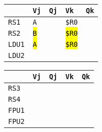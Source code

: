 \begin{enumerate}
    \begin{minipage}{0.45\textwidth}
        \centering
        \begin{tabular}{@{} l | l l l l @{}}
            \toprule
                & \texttt{Vj} & \texttt{Qj} & \texttt{Vk} & \texttt{Qk} \\
            \midrule
            \texttt{RS1} & \texttt{A} & & \texttt{\$R0} & \\ [.3em]
            \texttt{RS2} & \hl{\texttt{B}} & & \hl{\texttt{\$R0}} & \\
            \cmidrule{1-5}
            \texttt{LDU1} & \hl{\texttt{A}} & & \hl{\texttt{\$R0}} & \\ [.3em]
            \texttt{LDU2} & & & & \\
            \bottomrule
        \end{tabular}
    \end{minipage}
    \hfill
    \begin{minipage}{0.45\textwidth}
        \centering
        \begin{tabular}{@{} l | l l l l @{}}
            \toprule
            & \texttt{Vj} & \texttt{Qj} & \texttt{Vk} & \texttt{Qk} \\
            \midrule
            \texttt{RS3} & & & & \\ [.3em]
            \texttt{RS4} & & & & \\
            \cmidrule{1-5}
            \texttt{FPU1} & & & & \\ [.3em]
            \texttt{FPU2} & & & & \\
            \bottomrule
        \end{tabular}
    \end{minipage}


\end{enumerate}

